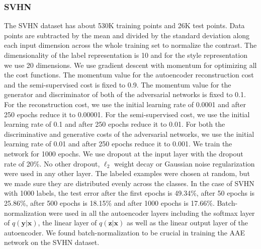 \documentclass{article}
\begin{document}
\begin{appendices}
\subsubsection{SVHN}
The SVHN dataset has about 530K training points and 26K test points. Data points are subtracted by the mean and divided by the standard deviation along each input dimension across the whole training set to normalize the contrast. The dimensionality of the label representation is 10 and for the style representation we use 20 dimensions. We use gradient descent with momentum for optimizing all the cost functions. The momentum value for the autoencoder reconstruction cost and the semi-supervised cost is fixed to 0.9. The momentum value for the generator and discriminator of both of the adversarial networks is fixed to 0.1. For the reconstruction cost, we use the initial learning rate of 0.0001 and after 250 epochs reduce it to 0.00001. For the semi-supervised cost, we use the initial learning rate of 0.1 and after 250 epochs reduce it to 0.01. For both the discriminative and generative costs of the adversarial networks, we use the initial learning rate of 0.01 and after 250 epochs reduce it to 0.001. We train the network for 1000 epochs. We use dropout at the input layer with the dropout rate of 20\%. No other dropout, $\ell_2$ weight decay or Gaussian noise regularization were used in any other layer. The labeled examples were chosen at random, but we made sure they are distributed evenly across the classes. In the case of SVHN with 1000 labels, the test error after the first epochs is 49.34\%, after 50 epochs is 25.86\%, after 500 epochs is 18.15\% and after 1000 epochs is 17.66\%. Batch-normalization were used in all the autoencoder layers including the softmax layer of $q(\mathbf{y}|\mathbf{x})$, the linear layer of $q(\mathbf{z}|\mathbf{x})$ as well as the linear output layer of the autoencoder. We found batch-normalization \citep{batch} to be crucial in training the AAE network on the SVHN dataset.


\end{appendices}
\end{document}
